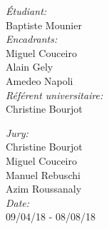 \begin{titlepage}
\begin{center}
\begin{minipage}[t]{0.4\textwidth}
\begin{flushleft} \large
\emph{Étudiant:}\\
Baptiste Mounier\\
\bigbreak
\emph{Encadrants:} \\
Miguel Couceiro\\
Alain Gely\\
Amedeo Napoli\\
\bigbreak
\emph{Référent universitaire:} \\
Christine Bourjot
\end{flushleft}
\end{minipage}
\begin{minipage}[t]{0.4\textwidth}
\begin{flushright} \large
\emph{Jury:}\\
Christine Bourjot\\
Miguel Couceiro\\
Manuel Rebuschi\\
Azim Roussanaly\\
\bigbreak
\emph{Date:}\\
09/04/18 - 08/08/18
\end{flushright}
\end{minipage}



\end{center}
\end{titlepage}